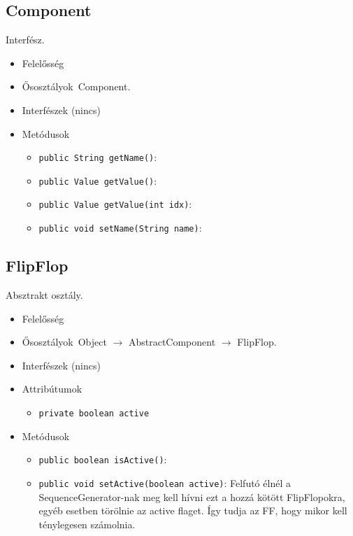 \subsection{Component}
Interfész.
\begin{itemize}
\item Felelősség\\

\item Ősosztályok\ Component.
\item Interfészek (nincs)
\item Metódusok$\ $
\begin{itemize}
	\item \texttt{public String getName()}: 
	\item \texttt{public Value getValue()}: 
	\item \texttt{public Value getValue(int idx)}: 
	\item \texttt{public void setName(String name)}: 
\end{itemize}
\end{itemize}

\subsection{FlipFlop}
Absztrakt osztály.
\begin{itemize}
\item Felelősség\\

\item Ősosztályok\ Object $\rightarrow{}$ AbstractComponent $\rightarrow{}$ FlipFlop.
\item Interfészek (nincs)
\item Attribútumok $\ $
\begin{itemize}
	\item \texttt{private boolean active} 
\end{itemize}
\item Metódusok$\ $
\begin{itemize}
	\item \texttt{public boolean isActive()}: 
	\item \texttt{public void setActive(boolean active)}: Felfutó élnél a SequenceGenerator-nak meg kell hívni ezt a hozzá kötött  FlipFlopokra, egyéb esetben törölnie az active flaget. Így tudja az FF, hogy  mikor kell ténylegesen számolnia.
\end{itemize}
\end{itemize}

